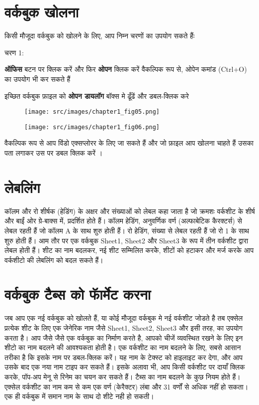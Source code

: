 \section{वर्कबुक खोलना}\label{id-1.4}

किसी मौजूदा वर्कबुक को खोलने के लिए, आप निम्न चरणों का उपयोग सकते हैंः
\begin{descriptionSimple}{चरण 1:}
\item[चरण 1] \textbf{ऑफिस} बटन पर क्लिक करें और फिर \textbf{ओपन} क्लिक करें वैकल्पिक रूप से, ओपेन कमांड  {\rm (Ctrl+O)}  का उपयोग भी कर सकते हैं
\item[चरण 2] इच्छित वर्कबुक फ़ाइल को \textbf{ओपन डायलॉग} बॉक्स मे ढूँढें और डबल-क्लिक करे
\end{descriptionSimple}
\begin{figure}[H]
\centering
\texttt{[image: src/images/chapter1\_fig05.png]}
\end{figure}
\begin{figure}[H]
\centering
\texttt{[image: src/images/chapter1\_fig06.png]}
\end{figure}

वैकल्पिक रूप से आप विंडो एक्सप्लोरर के लिए जा सकते हैं और जो फ़ाइल आप खोलना चाहते हैं उसका पता लगाकर उस पर डबल क्लिक करें ।

\section{लेबलिंग}\label{id-1.5}

कॉलम और रो शीर्षक (हेडिंग) के अक्षर और संख्याओं को लेबल कहा जाता है जो क्रमशः वर्कशीट के शीर्ष और बाईं ओर ग्रे-बाक्स में, प्रदर्शित होते हैं। कॉलम हेडिंग, अनुवर्णिक वर्ण (अल्फाबेटिक कैरक्टर्स) से लेबल रहती हैं जो कॉलम {\rm A} के साथ शुरु होती हैं। रो हेडिंग, संख्या से लेबल रहती हैं जो रो {\rm 1} के साथ शुरु होती हैं। आम तौर पर एक वर्कबुक {\rm Sheet1, Sheet2} और {\rm Sheet3} के रूप में तीन वर्कशीट द्वारा लेबल होती हैं। शीट का नाम बदलकर, नई शीट सम्मिलित करकेे, शीटों को हटाकर और मर्ज करके आप वर्कशीटो की लेबलिंग को बदल सकते हैं।

\section{वर्कबुक टैब्स को फॅार्मेट करना}\label{id-1.6}

जब आप एक नई वर्कबुक को खोलते हैं, या कोई मौजूदा वर्कबुक मे नई वर्कशीट जोडते है तब एक्सेल प्रत्येक शीट के लिए एक जेनेरिक नाम जैसे  {\rm Sheet1, Sheet2, Sheet3}  और इसी तरह, का उपयोग करता है। आप जैसे जैसे एक वर्कबुक का निर्माण करते है, आपको चीजें व्यवस्थित रखने के लिए इन शीटो का नाम बदलने की आवश्यकता होती है। एक वर्कशीट का नाम बदलने के लिए, सबसे आसान तरीका है कि इसके नाम पर डबल-क्लिक करें। यह नाम के टेक्स्ट को हाइलाइट कर देगा, और आप उसके बाद एक नया नाम टाइप कर सकते हैं। इसके अलावा भी, आप किसी वर्कशीट पर दायाँ क्लिक करके, पॉप-अप मेनू से रिनेम का चयन कर सकते हैं। टैब्स का नाम बदलने के कुछ नियम होते हैं। एक्सेल वर्कशीट का नाम कम से कम एक वर्ण (केरैक्टर) लंबा और 31 वर्णों से अधिक नहीं हो सकता। एक ही वर्कबुक में समान नाम के साथ दो शीटे नही हो सकती।

